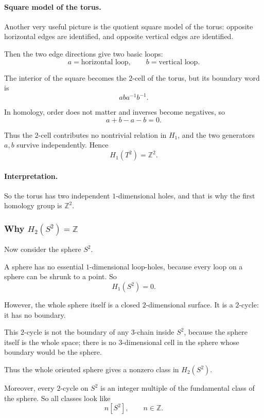 \documentclass[12pt,a4paper]{article}
\theoremstyle{notespace}
\begin{document}
\paragraph{Square model of the torus.}
Another very useful picture is the quotient square model of the torus:
opposite horizontal edges are identified, and opposite vertical edges are identified.

Then the two edge directions give two basic loops:
\[
a=\text{horizontal loop}, \qquad b=\text{vertical loop}.
\]

The interior of the square becomes the \(2\)-cell of the torus, but its boundary word is
\[
aba^{-1}b^{-1}.
\]

In homology, order does not matter and inverses become negatives, so
\[
a+b-a-b=0.
\]

Thus the \(2\)-cell contributes no nontrivial relation in \(H_1\), and the two generators \(a,b\) survive independently. Hence
\[
H_1(T^2)=\mathbb Z^2.
\]

\paragraph{Interpretation.}
So the torus has two independent \(1\)-dimensional holes, and that is why the first homology group is \(\mathbb Z^2\).

\subsubsection{Why \texorpdfstring{$H_2(S^2)=\mathbb Z$}{H2(S2)=Z}}

Now consider the sphere \(S^2\).

A sphere has no essential \(1\)-dimensional loop-holes, because every loop on a sphere can be shrunk to a point. So
\[
H_1(S^2)=0.
\]

However, the whole sphere itself is a closed \(2\)-dimensional surface. It is a \(2\)-cycle: it has no boundary.

This \(2\)-cycle is not the boundary of any \(3\)-chain inside \(S^2\), because the sphere itself is the whole space; there is no \(3\)-dimensional cell in the sphere whose boundary would be the sphere.

Thus the whole oriented sphere gives a nonzero class in \(H_2(S^2)\).

Moreover, every \(2\)-cycle on \(S^2\) is an integer multiple of the fundamental class of the sphere. So all classes look like
\[
n[S^2], \qquad n\in\mathbb Z.
\]
\end{document}
